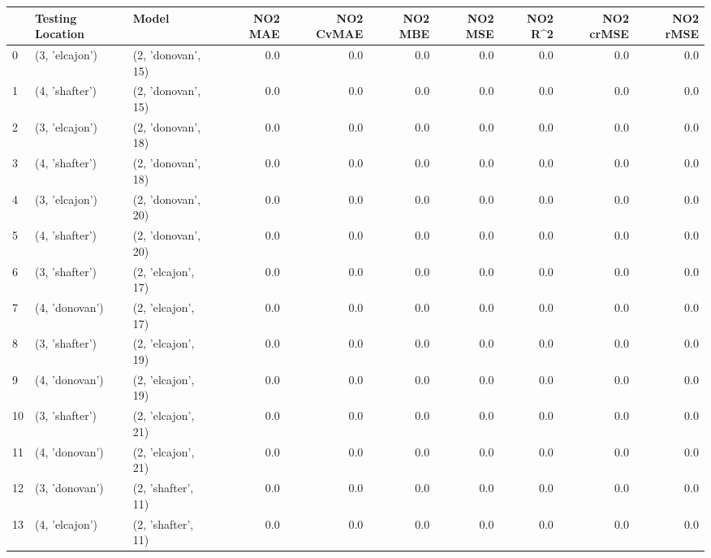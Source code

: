 \begin{tabular}{lllrrrrrrr}
\toprule
{} & Testing Location &               Model &  NO2 MAE &  NO2 CvMAE &  NO2 MBE &  NO2 MSE &  NO2 R\textasciicircum2 &  NO2 crMSE &  NO2 rMSE \\
\midrule
0  &   (3, 'elcajon') &  (2, 'donovan', 15) &      0.0 &        0.0 &      0.0 &      0.0 &      0.0 &        0.0 &       0.0 \\
1  &   (4, 'shafter') &  (2, 'donovan', 15) &      0.0 &        0.0 &      0.0 &      0.0 &      0.0 &        0.0 &       0.0 \\
2  &   (3, 'elcajon') &  (2, 'donovan', 18) &      0.0 &        0.0 &      0.0 &      0.0 &      0.0 &        0.0 &       0.0 \\
3  &   (4, 'shafter') &  (2, 'donovan', 18) &      0.0 &        0.0 &      0.0 &      0.0 &      0.0 &        0.0 &       0.0 \\
4  &   (3, 'elcajon') &  (2, 'donovan', 20) &      0.0 &        0.0 &      0.0 &      0.0 &      0.0 &        0.0 &       0.0 \\
5  &   (4, 'shafter') &  (2, 'donovan', 20) &      0.0 &        0.0 &      0.0 &      0.0 &      0.0 &        0.0 &       0.0 \\
6  &   (3, 'shafter') &  (2, 'elcajon', 17) &      0.0 &        0.0 &      0.0 &      0.0 &      0.0 &        0.0 &       0.0 \\
7  &   (4, 'donovan') &  (2, 'elcajon', 17) &      0.0 &        0.0 &      0.0 &      0.0 &      0.0 &        0.0 &       0.0 \\
8  &   (3, 'shafter') &  (2, 'elcajon', 19) &      0.0 &        0.0 &      0.0 &      0.0 &      0.0 &        0.0 &       0.0 \\
9  &   (4, 'donovan') &  (2, 'elcajon', 19) &      0.0 &        0.0 &      0.0 &      0.0 &      0.0 &        0.0 &       0.0 \\
10 &   (3, 'shafter') &  (2, 'elcajon', 21) &      0.0 &        0.0 &      0.0 &      0.0 &      0.0 &        0.0 &       0.0 \\
11 &   (4, 'donovan') &  (2, 'elcajon', 21) &      0.0 &        0.0 &      0.0 &      0.0 &      0.0 &        0.0 &       0.0 \\
12 &   (3, 'donovan') &  (2, 'shafter', 11) &      0.0 &        0.0 &      0.0 &      0.0 &      0.0 &        0.0 &       0.0 \\
13 &   (4, 'elcajon') &  (2, 'shafter', 11) &      0.0 &        0.0 &      0.0 &      0.0 &      0.0 &        0.0 &       0.0 \\

\end{tabular}
